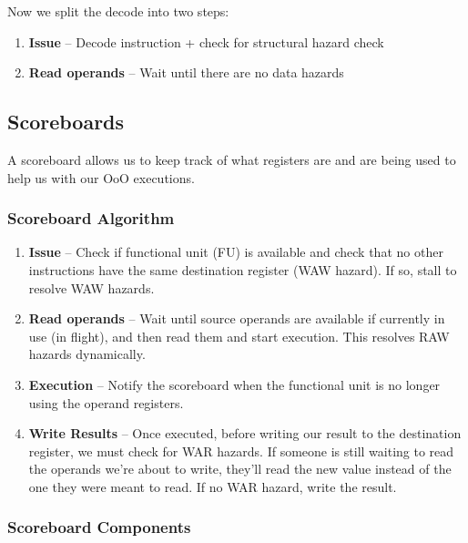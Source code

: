 \documentclass{article}
\begin{document}
Now we split the decode into two steps:

\begin{enumerate}
\item \textbf{Issue} -- Decode instruction + check for structural hazard check

\item \textbf{Read operands} -- Wait until there are no data hazards
\end{enumerate}

\subsection{Scoreboards}

A scoreboard allows us to keep track of what registers are and are being used to help us with our OoO executions. 

\subsubsection{Scoreboard Algorithm}

\begin{enumerate}
\item \textbf{Issue} -- Check if functional unit (FU) is available and check that no other instructions have the same destination register (WAW hazard). If so, stall to resolve WAW hazards.

\item \textbf{Read operands} -- Wait until source operands are available if currently in use (in flight), and then read them and start execution. This resolves RAW hazards dynamically.

\item \textbf{Execution} -- Notify the scoreboard when the functional unit is no longer using the operand registers.

\item \textbf{Write Results} -- Once executed, before writing our result to the destination register, we must check for WAR hazards. If someone is still waiting to read the operands we're about to write, they'll read the new value instead of the one they were meant to read. If no WAR hazard, write the result.

\end{enumerate}

\subsubsection{Scoreboard Components}
\end{document}
